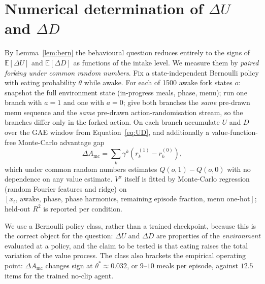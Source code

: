 \documentclass[11pt]{article}
\theoremstyle{definition}
\newcommand{\E}{\mathbb{E}}
\begin{document}
\section{Numerical determination of $\Delta U$ and $\Delta D$}
\label{sec:numerical}

By Lemma~\ref{lem:bern} the behavioural question reduces entirely to the signs
of $\E[\Delta U]$ and $\E[\Delta D]$ as functions of the intake level. We
measure them by \emph{paired forking under common random numbers}. Fix a
state-independent Bernoulli policy with eating probability $\theta$ while
awake. For each of 1500 awake fork states $o$: snapshot the full environment
state (in-progress meals, phase, menu); run one branch with $a=1$ and one with
$a=0$; give both branches the \emph{same} pre-drawn menu sequence and the
\emph{same} pre-drawn action-randomisation stream, so the branches differ only
in the forked action. On each branch accumulate $U$ and $D$ over the GAE
window from Equation~\eqref{eq:UD}, and additionally a value-function-free
Monte-Carlo advantage gap
\begin{equation}
\Delta A_{\mathrm{mc}}=\sum_k\gamma^k\left(r^{(1)}_k-r^{(0)}_k\right),
\label{eq:damc}
\end{equation}
which under common random numbers estimates $Q(o,1)-Q(o,0)$ with no
dependence on any value estimate. $V^\pi$ itself is fitted by Monte-Carlo
regression (random Fourier features and ridge) on
$\left[x_t,\,\text{awake},\,\text{phase},\,\text{phase harmonics},\,\text{remaining
episode fraction},\,\text{menu one-hot}\right]$; held-out $R^2$ is reported
per condition.

We use a Bernoulli policy class, rather than a trained checkpoint, because
this is the correct object for the question: $\Delta U$ and $\Delta D$ are
properties of the \emph{environment} evaluated at a policy, and the claim to
be tested is that eating raises the total variation of the value process. The
class also brackets the empirical operating point: $\Delta A_{\mathrm{mc}}$
changes sign at $\theta^\ast\approx0.032$, or $9$--$10$ meals per episode,
against $12.5$ items for the trained no-clip agent.
\end{document}
